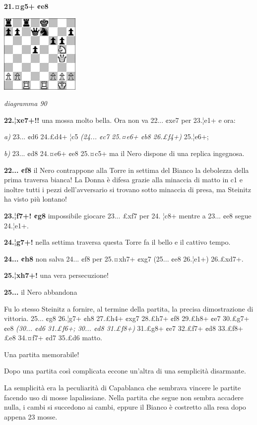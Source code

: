 \documentclass[
]{article}
\begin{document}
\textbf{21.¤g5+ ¢e8}

\includegraphics[width=1.5in,height=1.5in]{vertopal_109f12be458a423d8f3cc838880eaea2/media/image90.png}

\emph{diagramma 90}

\textbf{22.¦xe7+!!} una mossa molto bella. Ora non va 22... ¢xe7 per
23.¦e1+ e ora:

\emph{a)} 23... ¢d6 24.£d4+ ¦c5 \emph{(24... ¢c7 25.¤e6+ ¢b8 26.£f4+)}
25.¦e6+;

\emph{b)} 23... ¢d8 24.¤e6+ ¢e8 25.¤c5+ ma il Nero dispone di una
replica ingegnosa.

\textbf{22... ¢f8} il Nero contrappone alla Torre in settima del Bianco
la debolezza della prima traversa bianca! La Donna è difesa grazie alla
minaccia di matto in c1 e inoltre tutti i pezzi dell'avversario si
trovano sotto minaccia di presa, ma Steinitz ha visto più lontano!

\textbf{23.¦f7+! ¢g8} impossibile giocare 23... £xf7 per 24. ¦c8+ mentre
a 23... ¢e8 segue 24.¦e1+.

\textbf{24.¦g7+!} nella settima traversa questa Torre fa il bello e il
cattivo tempo.

\textbf{24... ¢h8} non salva 24... ¢f8 per 25.¤xh7+ ¢xg7 (25... ¢e8
26.¦e1+) 26.£xd7+.

\textbf{25.¦xh7+!} una vera persecuzione!

\textbf{25...} il Nero abbandona

Fu lo stesso Steinitz a fornire, al termine della partita, la precisa
dimostrazione di vittoria. 25... ¢g8 26.¦g7+ ¢h8 27.£h4+ ¢xg7 28.£h7+
¢f8 29.£h8+ ¢e7 30.£g7+ ¢e8 \emph{(30... ¢d6 31.£f6+; 30... ¢d8
31.£f8+)} 31.£g8+ ¢e7 32.£f7+ ¢d8 33.£f8+ £e8 34.¤f7+ ¢d7 35.£d6 matto.

Una partita memorabile!

Dopo una partita così complicata eccone un'altra di una semplicità
disarmante.

La semplicità era la peculiarità di Capablanca che sembrava vincere le
partite facendo uso di mosse lapalissiane. Nella partita che segue non
sembra accadere nulla, i cambi si succedono ai cambi, eppure il Bianco è
costretto alla resa dopo appena 23 mosse.
\end{document}
